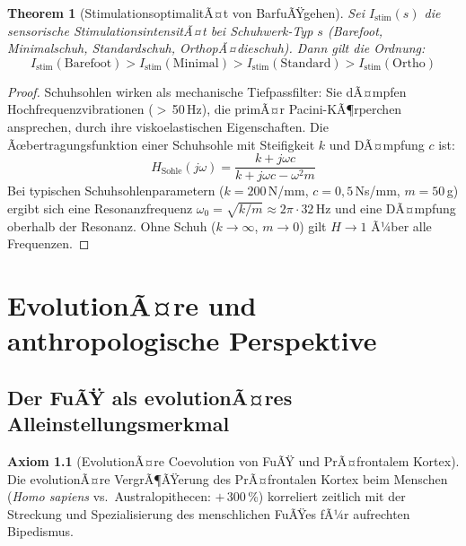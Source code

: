 ﻿\documentclass[12pt,a4paper]{report}
\theoremstyle{plain}
\newtheorem{theorem}{Theorem}[section]
\theoremstyle{definition}
\newtheorem{axiom}[theorem]{Axiom}
\theoremstyle{remark}
\begin{document}
\begin{theorem}[StimulationsoptimalitÃ¤t von BarfuÃŸgehen]
Sei $I_{\text{stim}}(s)$ die sensorische StimulationsintensitÃ¤t bei
Schuhwerk-Typ $s$ (Barefoot, Minimalschuh, Standardschuh, OrthopÃ¤dieschuh).
Dann gilt die Ordnung:
\[
  I_{\text{stim}}(\text{Barefoot}) > I_{\text{stim}}(\text{Minimal}) >
  I_{\text{stim}}(\text{Standard}) > I_{\text{stim}}(\text{Ortho})
\]
\end{theorem}

\begin{proof}
Schuhsohlen wirken als mechanische Tiefpassfilter: Sie dÃ¤mpfen
Hochfrequenzvibrationen ($>$\,50\,Hz), die primÃ¤r Pacini-KÃ¶rperchen ansprechen,
durch ihre viskoelastischen Eigenschaften. Die Ãœbertragungsfunktion einer
Schuhsohle mit Steifigkeit $k$ und DÃ¤mpfung $c$ ist:
\[
  H_{\text{Sohle}}(j\omega) = \frac{k + j\omega c}{k + j\omega c - \omega^2 m}
\]
Bei typischen Schuhsohlenparametern ($k = 200$\,N/mm, $c = 0{,}5$\,Ns/mm,
$m = 50$\,g) ergibt sich eine Resonanzfrequenz $\omega_0 = \sqrt{k/m}
\approx 2\pi \cdot 32$\,Hz und eine DÃ¤mpfung oberhalb der Resonanz.
Ohne Schuh ($k \to \infty$, $m \to 0$) gilt $H \to 1$ Ã¼ber alle Frequenzen.
\end{proof}

\chapter{EvolutionÃ¤re und anthropologische Perspektive}

\section{Der FuÃŸ als evolutionÃ¤res Alleinstellungsmerkmal}

\begin{axiom}[EvolutionÃ¤re Coevolution von FuÃŸ und PrÃ¤frontalem Kortex]
Die evolutionÃ¤re VergrÃ¶ÃŸerung des PrÃ¤frontalen Kortex beim Menschen
(\emph{Homo sapiens} vs.\ Australopithecen: $+$\,300\,\%) korreliert
zeitlich mit der Streckung und Spezialisierung des menschlichen FuÃŸes
fÃ¼r aufrechten Bipedismus.
\end{axiom}
\end{document}
